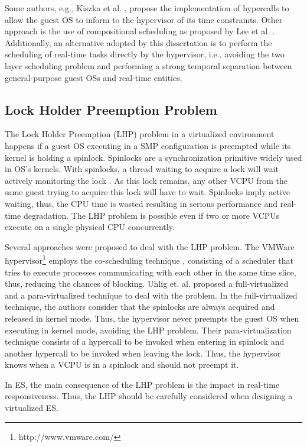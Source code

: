 Some authors, e.g., Kiszka et al. \cite{kiszka2009}, propose the implementation of hypercalls to allow the guest OS to inform to the hypervisor of its time constraints. Other approach is the use of compositional scheduling as proposed by Lee et al. \cite{Lee2012}. Additionally, an alternative adopted by this dissertation is to perform the scheduling of real-time tasks directly by the hypervisor, i.e., avoiding the two layer scheduling problem and performing a strong temporal separation between general-purpose guest OSs and real-time entities.


\subsection{Lock Holder Preemption Problem}
\label{subsection:holder}

The Lock Holder Preemption (LHP) problem in a virtualized environment happens if a guest OS executing in a SMP configuration is preempted while its kernel is holding a spinlock. Spinlocks are a synchronization primitive widely used in OS's kernels. With spinlocks, a thread waiting to acquire a lock will wait actively monitoring the lock \cite{mitake2012}. As this lock remains, any other VCPU from the same guest trying to acquire this lock will have to wait. Spinlocks imply active waiting, thus, the CPU time is wasted resulting in serious performance and real-time degradation. The LHP problem is possible even if two or more VCPUs execute on a single physical CPU concurrently.

Several approaches were proposed to deal with the LHP problem. The VMWare hypervisor\footnote{http://www.vmware.com/} employs the co-scheduling technique \cite{ousterhout1982}, consisting of a scheduler that tries to execute processes communicating with each other in the same time slice, thus, reducing the chances of blocking. Uhlig et. al. \cite{uhlig2004} proposed a full-virtualized and a para-virtualized technique to deal with the problem. In the full-virtualized technique, the authors consider that the spinlocks are always acquired and released in kernel mode. Thus, the hypervisor never preempts the guest OS when executing in kernel mode, avoiding the LHP problem. Their para-virtualization technique consists of a hypercall to be invoked when entering in spinlock and another hypercall to be invoked when leaving the lock. Thus, the hypervisor knows when a VCPU is in a spinlock and should not preempt it. 

In ES, the main consequence of the LHP problem is the impact in real-time responsiveness. Thus, the LHP should be carefully considered when designing a virtualized ES.


